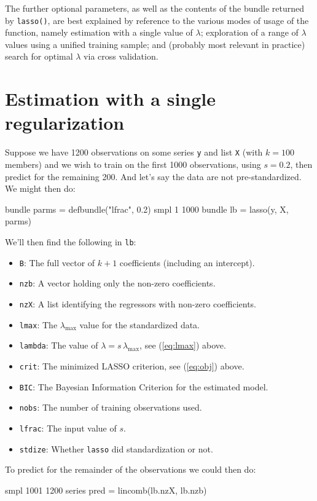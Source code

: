 \documentclass{article}
\begin{document}
The further optional parameters, as well as the contents of the bundle
returned by \texttt{lasso()}, are best explained by reference to the
various modes of usage of the function, namely estimation with a
single value of $\lambda$; exploration of a range of $\lambda$ values
using a unified training sample; and (probably most relevant in
practice) search for optimal $\lambda$ via cross validation.

\section{Estimation with a single regularization}
\label{sec:single-lambda}

Suppose we have 1200 observations on some series \texttt{y} and list
\texttt{X} (with $k=100$ members) and we wish to train on the first
1000 observations, using $s = 0.2$, then predict for the remaining
200. And let's say the data are not pre-standardized. We might then
do:
\begin{code}
bundle parms = defbundle("lfrac", 0.2)
smpl 1 1000
bundle lb = lasso(y, X, parms)
\end{code}
We'll then find the following in \texttt{lb}:
\begin{itemize}
\item \texttt{B}: The full vector of $k+1$ coefficients (including an
  intercept).
\item \texttt{nzb}: A vector holding only the non-zero coefficients.
\item \texttt{nzX}: A list identifying the regressors with non-zero
  coefficients.
\item \texttt{lmax}: The $\lambda_{\max}$ value for the standardized
  data.
\item \texttt{lambda}: The value of $\lambda = s\,\lambda_{\max}$, see
  (\ref{eq:lmax}) above.
\item \texttt{crit}: The minimized LASSO criterion, see (\ref{eq:obj})
  above.
\item \texttt{BIC}: The Bayesian Information Criterion for the
  estimated model.
\item \texttt{nobs}: The number of training observations used.
\item \texttt{lfrac}: The input value of $s$.
\item \texttt{stdize}: Whether \texttt{lasso} did standardization or
  not.
\end{itemize}

To predict for the remainder of the observations we could then do:
\begin{code}
smpl 1001 1200
series pred = lincomb(lb.nzX, lb.nzb)
\end{code}
\end{document}
